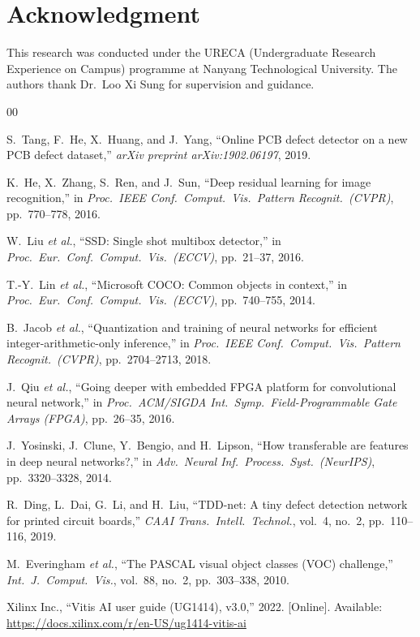 \documentclass[conference]{IEEEtran}
\begin{document}
\section*{Acknowledgment}

This research was conducted under the URECA (Undergraduate Research Experience on Campus) programme at Nanyang Technological University. The authors thank Dr.\ Loo Xi Sung for supervision and guidance.

\begin{thebibliography}{00}

S.~Tang, F.~He, X.~Huang, and J.~Yang,
``Online PCB defect detector on a new PCB defect dataset,''
\emph{arXiv preprint arXiv:1902.06197}, 2019.

K.~He, X.~Zhang, S.~Ren, and J.~Sun,
``Deep residual learning for image recognition,''
in \emph{Proc.\ IEEE Conf.\ Comput.\ Vis.\ Pattern Recognit.\ (CVPR)},
pp.~770--778, 2016.

W.~Liu \emph{et al.},
``SSD: Single shot multibox detector,''
in \emph{Proc.\ Eur.\ Conf.\ Comput.\ Vis.\ (ECCV)},
pp.~21--37, 2016.

T.-Y.~Lin \emph{et al.},
``Microsoft COCO: Common objects in context,''
in \emph{Proc.\ Eur.\ Conf.\ Comput.\ Vis.\ (ECCV)},
pp.~740--755, 2014.

B.~Jacob \emph{et al.},
``Quantization and training of neural networks for efficient integer-arithmetic-only inference,''
in \emph{Proc.\ IEEE Conf.\ Comput.\ Vis.\ Pattern Recognit.\ (CVPR)},
pp.~2704--2713, 2018.

J.~Qiu \emph{et al.},
``Going deeper with embedded FPGA platform for convolutional neural network,''
in \emph{Proc.\ ACM/SIGDA Int.\ Symp.\ Field-Programmable Gate Arrays (FPGA)},
pp.~26--35, 2016.

J.~Yosinski, J.~Clune, Y.~Bengio, and H.~Lipson,
``How transferable are features in deep neural networks?,''
in \emph{Adv.\ Neural Inf.\ Process.\ Syst.\ (NeurIPS)},
pp.~3320--3328, 2014.

R.~Ding, L.~Dai, G.~Li, and H.~Liu,
``TDD-net: A tiny defect detection network for printed circuit boards,''
\emph{CAAI Trans.\ Intell.\ Technol.}, vol.~4, no.~2, pp.~110--116, 2019.

M.~Everingham \emph{et al.},
``The PASCAL visual object classes (VOC) challenge,''
\emph{Int.\ J.\ Comput.\ Vis.}, vol.~88, no.~2, pp.~303--338, 2010.

Xilinx Inc.,
``Vitis AI user guide (UG1414), v3.0,''
2022. [Online]. Available: \url{https://docs.xilinx.com/r/en-US/ug1414-vitis-ai}

\end{thebibliography}
\end{document}
